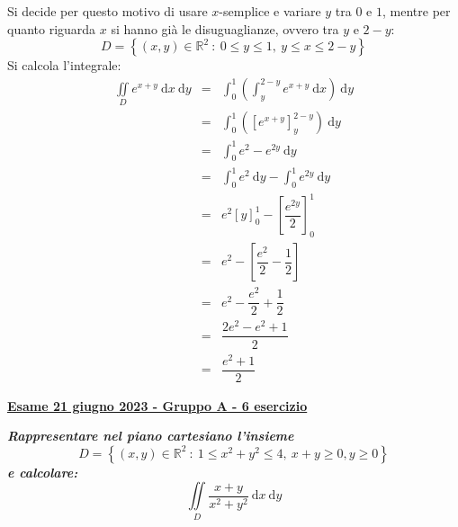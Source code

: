 \documentclass[a4paper]{article}
\newcommand{\definition}[1]{\textcolor{Red3}{\textbf{#1}}}
\newcommand{\example}[1]{\textcolor{Green4}{\textbf{#1}}}
\begin{document}
	Si decide per questo motivo di usare $x$-semplice e variare $y$ tra $0$ e $1$, mentre per quanto riguarda $x$ si hanno già le disuguaglianze, ovvero tra $y$ e $2-y$:
	\begin{equation*}
		D = \left\{\left(x,y\right) \in \mathbb{R}^{2} \: : \: 0 \le y \le 1, \: y \le x \le 2-y\right\}
	\end{equation*}
	Si calcola l'integrale:
	\begin{equation*}
		\begin{array}{rcl}
			\displaystyle\iint\limits_{D} e^{x+y} \:\mathrm{d}x\:\mathrm{d}y
			&=&
			\displaystyle\int_{0}^{1} \left(\int_{y}^{2-y} e^{x+y} \:\mathrm{d}x\right) \:\mathrm{d}y \\ [1.5em]
			&=&
			\displaystyle\int_{0}^{1} \left(\left[e^{x+y}\right]_{y}^{2-y} \right) \:\mathrm{d}y \\ [1.5em]
			&=&
			\displaystyle\int_{0}^{1} e^{2} - e^{2y} \:\mathrm{d}y \\ [1.5em]
			&=&
			\displaystyle\int_{0}^{1} e^{2} \:\mathrm{d}y - \displaystyle\int_{0}^{1} e^{2y} \:\mathrm{d}y \\ [1.5em]
			&=&
			e^{2}\left[y\right]_{0}^{1} - \left[\dfrac{e^{2y}}{2}\right]_{0}^{1} \\ [1.5em]
			&=&
			e^{2} - \left[\dfrac{e^{2}}{2} - \dfrac{1}{2}\right] \\ [1.5em]
			&=&
			e^{2} - \dfrac{e^{2}}{2} + \dfrac{1}{2} \\ [1.5em]
			&=&
			\dfrac{2e^{2} - e^{2} + 1}{2} \\ [1.5em]
			&=&
			\dfrac{e^{2} + 1}{2}
		\end{array}
	\end{equation*}

	\newpage

	\begin{flushleft}
		\label{exam: esame 21 giugno 2023 - Gruppo A - 6 esercizio}
		\hypertarget{
			exam: esame 21 giugno 2023 - Gruppo A - 6 esercizio
		}{
			\definition{\underline{Esame 21 giugno 2023 - Gruppo A - 6 esercizio}}
		}
	\end{flushleft}
	\example{\emph{Rappresentare nel piano cartesiano l'insieme}
	\begin{equation*}
		D = \left\{\left(x,y\right) \in \mathbb{R}^{2} \: : \: 1 \le x^{2}+y^{2} \le 4, \: x+y \ge 0, y \ge 0\right\}
	\end{equation*}
	\emph{e calcolare:}
	\begin{equation*}
		\displaystyle\iint\limits_{D} \dfrac{x+y}{x^{2}+y^{2}} \:\mathrm{d}x\:\mathrm{d}y
	\end{equation*}}
\end{document}
